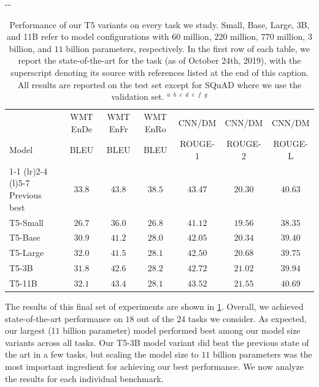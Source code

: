 \documentclass[twoside,11pt]{article}
\newlength{\offsetpage}
\newenvironment{widepage}{\begin{adjustwidth}{-\offsetpage}{-\offsetpage}
    \addtolength{\textwidth}{2\offsetpage}}
{\end{adjustwidth}}
\newcommand{\xe}{\makebox[0pt][l]{$^e$}}
\newcommand{\xf}{\makebox[0pt][l]{$^f$}}
\newcommand{\xg}{\makebox[0pt][l]{$^g$}}
\def\*#1{\mathbf{#1}}
\begin{document}
\begin{table}
\begin{widepage}
\vspace{0.2em}

\begin{tabular}{l c c c c c c}
                  & WMT EnDe      & WMT EnFr      & WMT EnRo      & CNN/DM      & CNN/DM      & CNN/DM  \\
    Model         & BLEU          & BLEU          & BLEU          & ROUGE-1     & ROUGE-2     & ROUGE-L \\
\cmidrule(r){1-1}
\cmidrule(lr){2-4}
\cmidrule(l){5-7}
    Previous best & $\*{33.8}$\xe & $\*{43.8}$\xe & $\*{38.5}$\xf & $43.47$\xg  & $20.30$\xg  & $40.63$\xg \\
    T5-Small      & $26.7$        & $36.0$        & $26.8$        & $41.12$     & $19.56$     & $38.35$     \\
    T5-Base       & $30.9$        & $41.2$        & $28.0$        & $42.05$     & $20.34$     & $39.40$     \\
    T5-Large      & $32.0$        & $41.5$        & $28.1$        & $42.50$     & $20.68$     & $39.75$     \\
    T5-3B         & $31.8$        & $42.6$        & $28.2$        & $42.72$     & $21.02$     & $39.94$     \\
    T5-11B        & $32.1$        & $43.4$        & $28.1$        & $\*{43.52}$ & $\*{21.55}$ & $\*{40.69}$ \\
\bottomrule
\end{tabular}

\end{widepage}
\caption{
Performance of our T5 variants on every task we study.
Small, Base, Large, 3B, and 11B refer to model configurations with $60$ million, $220$ million, $770$ million, $3$ billion, and $11$ billion parameters, respectively.
In the first row of each table, we report the state-of-the-art for the task (as of October 24th, 2019), with the superscript denoting its source with references listed at the end of this caption.
All results are reported on the test set except for SQuAD where we use the validation set.
$^a$\citep{lan2019albert}
$^b$\citep{wang2019structbert}
$^c$\citep{zhu2019freelb}
$^d$\citep{liu2019roberta}
$^e$\citep{edunov2018understanding}
$^f$\citep{lample2019cross}
$^g$\citep{dong2019unified}
}
\label{tab:final}
\end{table}

The results of this final set of experiments are shown in \cref{tab:final}.
Overall, we achieved state-of-the-art performance on $18$ out of the $24$ tasks we consider.
As expected, our largest ($11$ billion parameter) model performed best among our model size variants across all tasks.
Our T5-3B model variant did beat the previous state of the art in a few tasks, but scaling the model size to $11$ billion parameters was the most important ingredient for achieving our best performance.
We now analyze the results for each individual benchmark.
\end{document}
